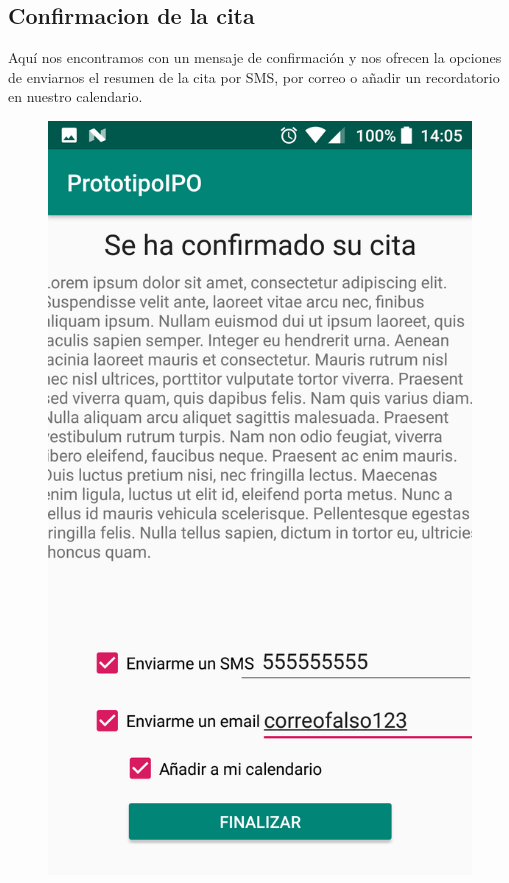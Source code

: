 \documentclass[a4paper,11pt]{article}
\begin{document}
\subsection{Confirmacion de la cita}
Aquí nos encontramos con un mensaje de confirmación y nos ofrecen la opciones de enviarnos el resumen de la cita por SMS, por correo o añadir un recordatorio en nuestro calendario.
\begin{figure}[H]
\centering
\begin{minipage}{.45\linewidth}
\includegraphics[width=\textwidth]{12.png}

\end{minipage}
\end{figure}
\end{document}
